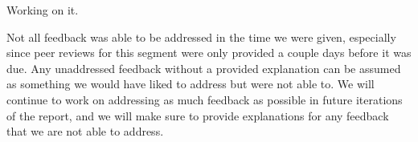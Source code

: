 {
  Working on it.
}

{
  Not all feedback was able to be addressed in the time we were given, especially since peer reviews for this segment were only provided a couple days before it was due. Any unaddressed feedback without a provided explanation can be assumed as something we would have liked to address but were not able to. We will continue to work on addressing as much feedback as possible in future iterations of the report, and we will make sure to provide explanations for any feedback that we are not able to address.
}

{}


